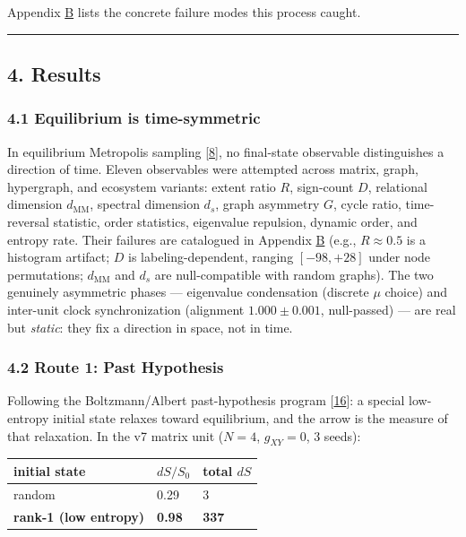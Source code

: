 Appendix \hyperref[appendix-b-trap-catalog]{B} lists the concrete
failure modes this process caught.

\begin{center}\rule{0.5\linewidth}{0.5pt}\end{center}

\subsection{4. Results}\label{results}

\subsubsection{4.1 Equilibrium is
time-symmetric}\label{equilibrium-is-time-symmetric}

In equilibrium Metropolis sampling {[}\hyperref[ref-8]{8}{]}, no
final-state observable distinguishes a direction of time. Eleven
observables were attempted across matrix, graph, hypergraph, and
ecosystem variants: extent ratio \(R\), sign-count \(D\), relational
dimension \(d_{\mathrm{MM}}\), spectral dimension \(d_s\), graph
asymmetry \(G\), cycle ratio, time-reversal statistic, order statistics,
eigenvalue repulsion, dynamic order, and entropy rate. Their failures
are catalogued in Appendix \hyperref[appendix-b-trap-catalog]{B} (e.g.,
\(R\approx0.5\) is a histogram artifact; \(D\) is labeling-dependent,
ranging \([-98,+28]\) under node permutations; \(d_{\mathrm{MM}}\) and
\(d_s\) are null-compatible with random graphs). The two genuinely
asymmetric phases --- eigenvalue condensation (discrete \(\mu\) choice)
and inter-unit clock synchronization (alignment \(1.000\pm0.001\),
null-passed) --- are real but \emph{static}: they fix a direction in
space, not in time.

\subsubsection{4.2 Route 1: Past
Hypothesis}\label{route-1-past-hypothesis}

Following the Boltzmann/Albert past-hypothesis program
{[}\hyperref[ref-16]{16}{]}: a special low-entropy initial state relaxes
toward equilibrium, and the arrow is the measure of that relaxation. In
the v7 matrix unit (\(N=4\), \(g_{XY}=0\), 3 seeds):

{\def\LTcaptype{none} %
\begin{longtable}[]{@{}lll@{}}
\toprule\noalign{}
initial state & \(dS/S_0\) & total \(dS\) \\
\midrule\noalign{}
\endhead
\bottomrule\noalign{}
\endlastfoot
random & 0.29 & 3 \\
\textbf{rank-1 (low entropy)} & \textbf{0.98} & \textbf{337} \\
\end{longtable}
}

